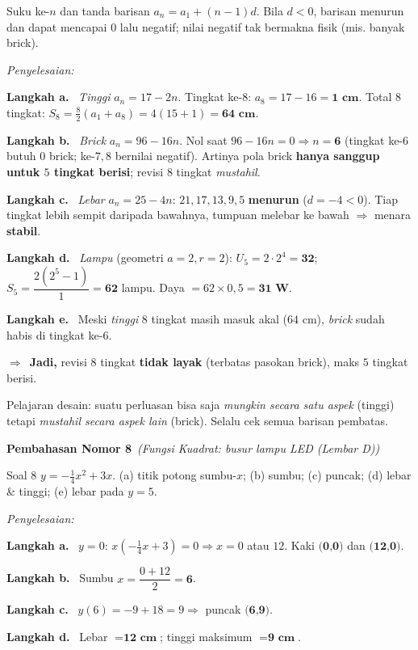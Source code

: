 \documentclass[11pt,a4paper]{article}
\newcommand{\jawab}{\par\smallskip\noindent\textit{\textcolor{oranye}{Penyelesaian:}}\par\smallskip}
\newcommand{\langkah}[1]{\par\smallskip\noindent\textbf{\textcolor{biru}{Langkah #1.}}\ }
\newcommand{\jadi}{\par\smallskip\noindent$\Rightarrow$\ \textbf{Jadi, }}
\newcommand{\nomorjudul}[2]{\par\bigskip\noindent%
  {\large\bfseries\color{ungu}Pembahasan Nomor #1}\ {\normalfont\itshape\color{gray}(#2)}\par\nopagebreak\smallskip}
\begin{document}
\begin{ingat}{Suku ke-$n$ dan tanda barisan}
$a_n=a_1+(n-1)d$. Bila $d<0$, barisan menurun dan dapat mencapai $0$ lalu negatif;
nilai negatif tak bermakna fisik (mis. banyak brick).
\end{ingat}

\jawab
\langkah{a} \emph{Tinggi} $a_n=17-2n$. Tingkat ke-$8$: $a_8=17-16=\textbf{1 cm}$.
Total $8$ tingkat: $S_8=\tfrac{8}{2}(a_1+a_8)=4(15+1)=\textbf{64 cm}$.

\langkah{b} \emph{Brick} $a_n=96-16n$. Nol saat $96-16n=0\Rightarrow n=\textbf{6}$
(tingkat ke-$6$ butuh $0$ brick; ke-$7,8$ bernilai negatif). Artinya pola brick
\textbf{hanya sanggup untuk $5$ tingkat berisi}; revisi $8$ tingkat \emph{mustahil}.

\langkah{c} \emph{Lebar} $a_n=25-4n$: $21,17,13,9,5$ \textbf{menurun} ($d=-4<0$).
Tiap tingkat lebih sempit daripada bawahnya, tumpuan melebar ke bawah
$\Rightarrow$ menara \textbf{stabil}.

\langkah{d} \emph{Lampu} (geometri $a=2,r=2$): $U_5=2\cdot2^4=\textbf{32}$;
$S_5=\dfrac{2(2^5-1)}{1}=\textbf{62}$ lampu. Daya $=62\times0{,}5=\textbf{31 W}$.

\langkah{e} Meski \emph{tinggi} $8$ tingkat masih masuk akal ($64$ cm), \emph{brick}
sudah habis di tingkat ke-$6$. \jadi revisi $8$ tingkat \textbf{tidak layak}
(terbatas pasokan brick), maks $5$ tingkat berisi.

\begin{tips}
Pelajaran desain: suatu perluasan bisa saja \emph{mungkin secara satu aspek}
(tinggi) tetapi \emph{mustahil secara aspek lain} (brick). Selalu cek semua
barisan pembatas.
\end{tips}

\nomorjudul{8}{Fungsi Kuadrat: busur lampu LED (Lembar D)}
\begin{soalbox}{Soal 8}
$y=-\tfrac14x^2+3x$. (a) titik potong sumbu-$x$; (b) sumbu; (c) puncak;
(d) lebar \& tinggi; (e) lebar pada $y=5$.
\end{soalbox}

\jawab
\langkah{a} $y=0$: $x(-\tfrac14x+3)=0\Rightarrow x=0$ atau $12$. Kaki
$\textbf{(0,0)}$ dan $\textbf{(12,0)}$.

\langkah{b} Sumbu $x=\dfrac{0+12}{2}=\textbf{6}$.

\langkah{c} $y(6)=-9+18=9\Rightarrow$ puncak $\textbf{(6,9)}$.

\langkah{d} Lebar $=\textbf{12 cm}$; tinggi maksimum $=\textbf{9 cm}$.
\end{document}
